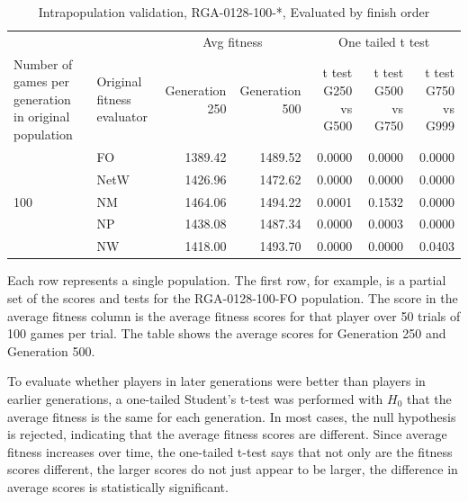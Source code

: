 \begin{table}[htbp]
  \centering
  \caption{Intrapopulation validation, RGA-0128-100-*, Evaluated by finish
  order}
    \begin{tabularx}{\linewidth}{|p{1in}|p{1in}|r|r|r|r|r|}
    \cline{3-7}
    \multicolumn{1}{l}{} &  & \multicolumn{2}{c|}{Avg fitness} & \multicolumn{3}{c|}{One tailed t test} \\
    \cline{1-7}
    Number of games per generation in original population
    & Original fitness evaluator
    & \multicolumn{1}{p{0.7in}|}{Generation 250}
    & \multicolumn{1}{p{0.7in}|}{Generation 500}
    & \multicolumn{1}{X|}{t test G250 vs G500}
    & \multicolumn{1}{X|}{t test G500 vs G750}
    & \multicolumn{1}{X|}{t test G750 vs G999} \\
    \cline{1-7}
      \multirow{5}{*}{100}
      & FO & 1389.42 & 1489.52 & 0.0000 & 0.0000 & 0.0000 \\
      \cline{2-7}
      & NetW & 1426.96 & 1472.62 & 0.0000 & 0.0000 & 0.0000 \\
      \cline{2-7}
      & NM & 1464.06 & 1494.22 & 0.0001 & 0.1532 & 0.0000 \\
      \cline{2-7}
      & NP & 1438.08 & 1487.34 & 0.0000 & 0.0003 & 0.0000 \\
      \cline{2-7}
      & NW & 1418.00 & 1493.70 & 0.0000 & 0.0000 & 0.0403 \\
      \cline{1-7}
    \end{tabularx}%
  \label{tab:validationRGA0128}%
\end{table}%

Each row represents a single population. The first row, for example, is a
partial set of the scores and tests for the RGA-0128-100-FO population. The
score in the average fitness column is the average fitness scores for that
player over 50 trials of 100 games per trial. The table shows the average scores
for Generation 250 and Generation 500.

To evaluate whether players in later generations were better than players in
earlier generations, a one-tailed Student's t-test was performed with $H_{0}$
that the average fitness is the same for each generation. In most cases, the
null hypothesis is rejected, indicating that the average fitness scores are
different. Since average fitness increases over time, the one-tailed t-test says
that not only are the fitness scores different, the larger scores do not just
appear to be larger, the difference in average scores is statistically
significant.

